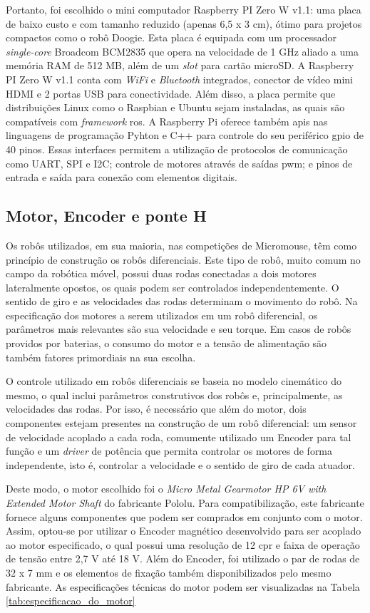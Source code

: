 Portanto, foi escolhido o mini computador Raspberry PI Zero W v1.1: uma placa de baixo custo e com tamanho reduzido (apenas 6,5 x 3 cm), ótimo para projetos compactos como o robô Doogie. Esta placa é equipada com um processador \textit{single-core} Broadcom BCM2835 que opera na velocidade de 1 GHz aliado a uma memória RAM de 512 MB, além de um \textit{slot} para cartão microSD. A Raspberry PI Zero W v1.1 conta com \textit{WiFi} e \textit{Bluetooth} integrados, conector de vídeo mini HDMI e 2 portas USB para conectividade. Além disso, a placa permite que distribuições Linux como o Raspbian e Ubuntu sejam instaladas, as quais são compatíveis com \textit{framework} \gls*{ros}. A Raspberry Pi oferece também \glspl*{api} nas linguagens de programação Pyhton e C++ para controle do seu periférico \gls*{gpio} de 40 pinos. Essas interfaces permitem a utilização de protocolos de comunicação como UART, SPI e I2C; controle de motores através de saídas \gls*{pwm}; e pinos de entrada e saída para conexão com elementos digitais.

\subsection{Motor, Encoder e ponte H}
\label{ssec:motor_encoder_ponte-h}
Os robôs utilizados, em sua maioria, nas competições de Micromouse, têm como princípio de construção os robôs diferenciais. Este tipo de robô, muito comum no campo da robótica móvel, possui duas rodas conectadas a dois motores lateralmente opostos, os quais podem ser controlados independentemente. O sentido de giro e as velocidades das rodas determinam  o movimento do robô. Na especificação dos motores a serem utilizados em um robô diferencial, os parâmetros mais relevantes são sua velocidade e seu torque. Em casos de robôs providos por baterias, o consumo do motor e a tensão de alimentação são também fatores primordiais na sua escolha.

O controle utilizado em robôs diferenciais se baseia no modelo cinemático do mesmo, o qual inclui parâmetros construtivos dos robôs e, principalmente, as velocidades das rodas. Por isso, é necessário que além do motor, dois componentes estejam presentes na construção de um robô diferencial: um sensor de velocidade acoplado a cada roda, comumente utilizado um Encoder para tal função e um \textit{driver} de potência que permita controlar os motores de forma independente, isto é, controlar a velocidade e o sentido de giro de cada atuador.

Deste modo, o motor escolhido foi o \textit{Micro Metal Gearmotor HP 6V with Extended Motor Shaft} do fabricante Pololu. Para compatibilização, este fabricante fornece alguns componentes que podem ser comprados em conjunto com o motor. Assim, optou-se por utilizar o Encoder magnético desenvolvido para ser acoplado ao motor especificado, o qual possui uma resolução de 12 \gls*{cpr} e faixa de operação de tensão entre 2,7 V até 18 V. Além do Encoder, foi utilizado o par de rodas de 32 x 7 mm e os elementos de fixação também disponibilizados pelo mesmo fabricante. As especificações técnicas do motor podem ser visualizadas na Tabela \ref{tab:especificacao_do_motor}

